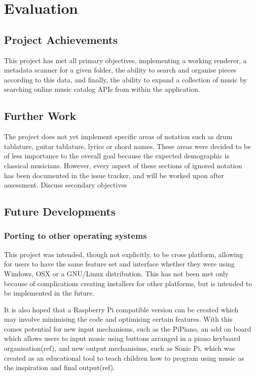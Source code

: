 \section{Evaluation}
\subsection{Project Achievements}
This project has met all primary objectives, implementing a working renderer, a metadata scanner for a given folder, the ability to search and organise pieces according to this data, and finally, the ability to expand a collection of music by searching online music catalog APIs from within the application. 

\subsection{Further Work}
The project does not yet implement specific areas of notation such as drum tablature, guitar tablature, lyrics or chord names. These areas were decided to be of less importance to the overall goal because the expected demographic is classical musicians. However, every aspect of these sections of ignored notation has been documented in the issue tracker, and will be worked upon after assessment.
Discuss secondary objectives

\subsection{Future Developments}
\subsubsection{Porting to other operating systems}
This project was intended, though not explicitly, to be cross platform, allowing for users to have the same feature set and interface whether they were using Windows, OSX or a GNU/Linux distribution. This has not been met only because of complications creating installers for other platforms, but is intended to be implemented in the future.

It is also hoped that a Raspberry Pi compatible version can be created which may involve minimising the code and optimising certain features. With this comes potential for new input mechanisms, such as the PiPiano, an add on board which allows users to input music using buttons arranged in a piano keyboard organisation(ref), and new output mechanisims, such as Sonic Pi, which was created as an educational tool to teach children how to program using music as the inspiration and final output(ref). 

